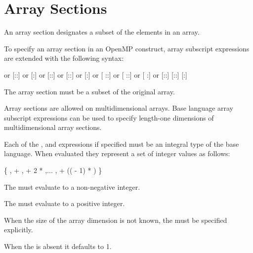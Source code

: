 \section{Array Sections}
\label{sec:Array Sections}

An array section designates a subset of the elements in an array.

\begin{ccppspecific}

To specify an array section in an OpenMP construct, array subscript expressions are
extended with the following syntax:

\begin{indentedcodelist}
 \textnormal{or}
[::\plc{ }] \textnormal{or}
[:] \textnormal{or}
[:\plc{ }:] \textnormal{or}
[:\plc{ }:\plc{ }] \textnormal{or}
[:\plc{ }] \textnormal{or}
[ ::] \textnormal{or}
[ ::\plc{ }] \textnormal{or}
[ :] \textnormal{or}
[\plc{ }:\plc{ }:]
[\plc{ }:\plc{ }:\plc{ }]
[\plc{ }:\plc{ }]
\end{indentedcodelist}

The array section must be a subset of the original array.

Array sections are allowed on multidimensional arrays. Base language array subscript
expressions can be used to specify length-one dimensions of multidimensional array
sections.

Each of the ,  and  expressions
if specified must be an integral type  of the base language.
When evaluated they represent a set of integer values as follows:

\{ ,  + ,  + 2 * ,... ,  + (( - 1) * ) \}

The  must evaluate to a non-negative integer.

The  must evaluate to a positive integer.

When the size of the array dimension is not known, the  must
be specified explicitly.

When the  is absent it defaults to 1.


\end{ccppspecific}
